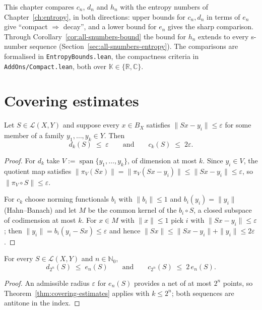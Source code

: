 This chapter compares $c_n$, $d_n$ and $h_n$ with the entropy numbers of
Chapter~\ref{ch:entropy}, in both directions: upper bounds for $c_n, d_n$ in
terms of $e_n$ give
``compact $\Rightarrow$ decay'', and a lower bound for $e_n$ gives the sharp
comparison. Through Corollary~\ref{cor:all-snumbers-bound} the bound for $h_n$
extends to every s-number sequence (Section~\ref{sec:all-snumbers-entropy}).
The comparisons are formalised in \texttt{EntropyBounds.lean},
the compactness criteria in \texttt{AddOns/Compact.lean}, both over
$\mathbb{K} \in \{\mathbb{R}, \mathbb{C}\}$.

\section{Covering estimates}
\label{sec:covering-estimates}

\begin{theorem}
\label{thm:covering-estimates}
\leanok
{}
Let $S \in \mathcal{L}(X, Y)$ and suppose every $x \in B_X$ satisfies
$\|Sx - y_i\| \le \varepsilon$ for some member of a family
$y_1, \dots, y_k \in Y$. Then
\[
  d_k(S) \;\le\; \varepsilon
  \qquad\text{and}\qquad
  c_k(S) \;\le\; 2\varepsilon .
\]
\end{theorem}
\begin{proof}
\leanok
For $d_k$ take $V := \operatorname{span}\{y_1, \dots, y_k\}$, of dimension at
most $k$. Since $y_i \in V$, the quotient map satisfies
$\|\pi_V(Sx)\| = \|\pi_V(Sx - y_i)\| \le \|Sx - y_i\| \le \varepsilon$, so
$\|\pi_V \circ S\| \le \varepsilon$.

For $c_k$ choose norming functionals $b_i$ with $\|b_i\| \le 1$ and
$b_i(y_i) = \|y_i\|$ (Hahn--Banach) and let $M$ be the common kernel of the
$b_i \circ S$, a closed subspace of codimension at most $k$. For $x \in M$
with $\|x\| \le 1$ pick $i$ with $\|Sx - y_i\| \le \varepsilon$; then
$\|y_i\| = b_i(y_i - Sx) \le \varepsilon$ and hence
$\|Sx\| \le \|Sx - y_i\| + \|y_i\| \le 2\varepsilon$.
\end{proof}

\begin{corollary}
\label{cor:dyadic-entropy}
\leanok
{}
For every $S \in \mathcal{L}(X, Y)$ and $n \in \mathbb{N}_0$,
\[
  d_{2^n}(S) \;\le\; e_n(S)
  \qquad\text{and}\qquad
  c_{2^n}(S) \;\le\; 2\, e_n(S) .
\]
\end{corollary}
\begin{proof}
\leanok
An admissible radius $\varepsilon$ for $e_n(S)$ provides a net of at most
$2^n$ points, so Theorem~\ref{thm:covering-estimates} applies with
$k \le 2^n$; both sequences are antitone in the index.
\end{proof}

